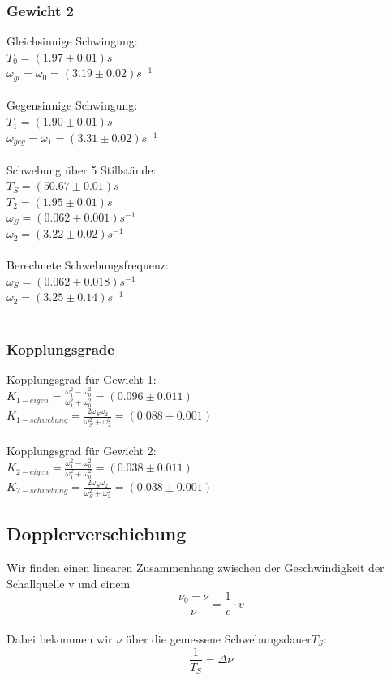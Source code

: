 \documentclass{article}
\begin{document}
\subsubsection{Gewicht 2}
Gleichsinnige Schwingung:\\
$T_0=(1.97 \pm 0.01)\si{s}$\\
$\omega_{gl}=\omega_0=(3.19 \pm 0.02)\si{s^{-1}}$\\
\\
Gegensinnige Schwingung:\\
$T_1=(1.90 \pm 0.01)\si{s}$\\
$\omega_{geg}=\omega_1=(3.31 \pm 0.02)\si{s^{-1}}$\\
\\
Schwebung über 5 Stillstände:\\
$T_S=(50.67 \pm 0.01)\si{s}$\\
$T_2=(1.95 \pm 0.01)\si{s}$\\
$\omega_S=(0.062 \pm 0.001)\si{s^{-1}}$\\
$\omega_2=(3.22 \pm 0.02)\si{s^{-1}}$\\
\\
Berechnete Schwebungsfrequenz:\\
$\omega_S=(0.062 \pm 0.018)\si{s^{-1}}$\\
$\omega_2=(3.25 \pm 0.14)\si{s^{-1}}$\\
\\

\subsubsection{Kopplungsgrade}
Kopplungsgrad für Gewicht 1:\\
$K_{1-eigen}=\frac{\omega_1^2-\omega_0^2}{\omega_1^2+\omega_0^2}=(0.096 \pm 0.011)$\\
$K_{1-schwebung}=\frac{2\omega_S \omega_2}{\omega_S^2 + \omega_2^2}=(0.088 \pm 0.001)$\\
\\
Kopplungsgrad für Gewicht 2:\\
$K_{2-eigen}=\frac{\omega_1^2-\omega_0^2}{\omega_1^2+\omega_0^2}=(0.038 \pm 0.011)$\\
$K_{2-schwebung}=\frac{2\omega_S \omega_2}{\omega_S^2 + \omega_2^2}=(0.038 \pm 0.001)$\\

\subsection{Dopplerverschiebung}
Wir finden einen linearen Zusammenhang zwischen der Geschwindigkeit der Schallquelle v und einem 
\begin{equation}
\label{frequenzlinear}
\frac{\nu_0-\nu}{\nu}=\frac{1}{c}\cdot v
\end{equation}
\\
Dabei bekommen wir $\nu$ über die gemessene Schwebungsdauer$T_S$:
\begin{equation}
\frac{1}{T_S}=\Delta \nu
\end{equation}
\end{document}
